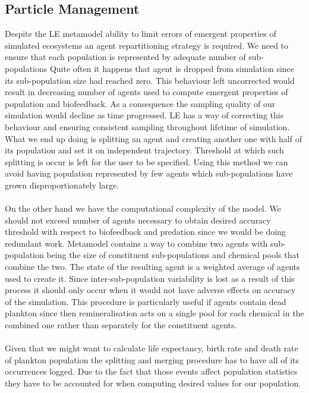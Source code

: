 \documentclass[12pt, a4paper]{report}
\begin{document}
\subsection{Particle Management}\label{sec:pm}
Despite the LE metamodel ability to limit errors of emergent properties of simulated ecosystems an agent
repartitioning strategy is required. We need to ensure that each population is represented by
adequate number of sub-populations Quite often it happens that agent is dropped from simulation
since its sub-population size had reached zero. This behaviour left uncorrected would result
in decreasing number of agents used to compute emergent properties of population and biofeedback.
As a consequence the sampling quality of our simulation would decline as time progressed.
LE has a way of correcting this behaviour and ensuring consistent sampling throughout lifetime
of simulation. What we end up doing is splitting an agent and creating another one with half of
its population and set it on independent trajectory. Threshold at which such splitting is occur
is left for the user to be specified. Using this method we can avoid having population represented
by few agents which sub-populations have grown disproportionately large.
\\\\
On the other hand we have the computational complexity of the model. We should not exceed number
of agents necessary to obtain desired accuracy threshold with respect to biofeedback and predation
since we would be doing redundant work. Metamodel contains a way to combine two agents
with sub-population being the size of constituent sub-populations and chemical pools that combine the two.
The state of the resulting agent is a weighted average of agents used to create it. Since inter-sub-population
variability is lost as a result of this process it should only occur when it would not have adverse effects
on accuracy of the simulation. This procedure is particularly useful if agents contain dead plankton since then
remineralisation acts on a single pool for each chemical in the combined one rather than separately for the
constituent agents.
\\\\
Given that we might want to calculate life expectancy, birth rate and death rate of plankton population
the splitting and merging procedure has to have all of its occurrences logged. Due to the fact that
those events affect population statistics they have to be accounted for when computing desired values
for our population.
\end{document}
